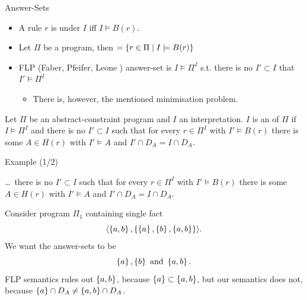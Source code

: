 \documentclass[trans,draft]{beamer} %
\newcommand{\catom}[2]{\ensuremath{\langle #1, #2 \rangle}}
\begin{document}
\begin{frame}{Answer-Sets}

	\begin{itemize}
		\item A rule $r$ is \emph{} under $I$ iff $I \models B(r)$.
		\item Let $\Pi$ be a program, then  $= \{r \in \Pi \mid I \models B(r)\}$
		\item FLP (Faber, Pfeifer, Leone \cite{FPL}) answer-set is $I \models \Pi^I$ s.t.\newline
		there is no $I' \subset I$ that $I' \models \Pi^I$
		\pause
		\begin{itemize}
			\item There is, however, the mentioned minimisation problem. %
		\end{itemize}
	\end{itemize}

	\pause

	\begin{definition}
	Let $\Pi$ be an abstract-constraint program and $I$ an interpretation.\newline
	\pause
	$I$ is an \emph{} of $\Pi$ if $I \models \Pi^I$ and there is no $I' \subset I$ such that\newline
	\pause
	for every $r \in \Pi^I$ with $I' \models B(r)$ there is some $A \in H(r)$ with
	$I' \models A$ and $I' \cap D_A = I \cap D_A$.
	\end{definition}

\end{frame}

\begin{frame}{Example (1/2)}

	\ldots\ there is no $I' \subset I$ such that for every $r \in \Pi^I$ with $I' \models B(r)$ there is some $A \in H(r)$ with
	$I' \models A$ and $I' \cap D_A = I \cap D_A$.

	\begin{example}[1]
	Consider program $\Pi_1$ containing single fact
	$$\catom{\set{a,b}}{\set{\set{a}, \set{b}, \set{a,b}}}.$$
	We want the answer-sets to be
	$$\left\{{a}\right\}, \left\{{b}\right\} \text{ and } \left\{{a,b}\right\}.$$
	FLP semantics rules out $\left\{{a,b}\right\}$, because $\left\{{a}\right\} \subset \left\{{a,b}\right\}$, but\newline
	our semantics does not, because $\left\{{a}\right\} \cap D_A \neq \left\{{a,b}\right\} \cap D_A$.
	\end{example}

\end{frame}
\end{document}
